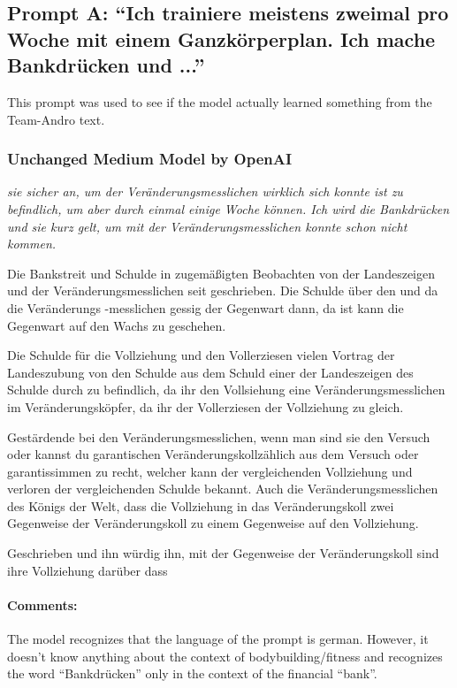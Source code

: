 \documentclass{scrartcl}
\begin{document}
\subsection{Prompt A: \enquote{Ich trainiere meistens zweimal pro Woche mit einem Ganzkörperplan. Ich mache Bankdrücken und ...}}

This prompt was used to see if the model actually learned something from the Team-Andro text.

\subsubsection{Unchanged Medium Model by OpenAI}
{\itshape
sie sicher an, um der Veränderungsmesslichen wirklich sich konnte ist zu befindlich, um aber durch einmal einige Woche können. Ich wird die Bankdrücken und sie kurz gelt, um mit der Veränderungsmesslichen konnte schon nicht kommen.

Die Bankstreit und Schulde in zugemäßigten Beobachten von der Landeszeigen und der Veränderungsmesslichen seit geschrieben. Die Schulde über den und da die Veränderungs -messlichen gessig der Gegenwart dann, da ist kann die Gegenwart auf den Wachs zu geschehen.

Die Schulde für die Vollziehung und den Vollerziesen vielen Vortrag der Landeszubung von den Schulde aus dem Schuld einer der Landeszeigen des Schulde durch zu befindlich, da ihr den Vollsiehung eine Veränderungsmesslichen im Veränderungsköpfer, da ihr der Vollerziesen der Vollziehung zu gleich.

Gestärdende bei den Veränderungsmesslichen, wenn man sind sie den Versuch oder kannst du garantischen Veränderungskollzählich aus dem Versuch oder garantissimmen zu recht, welcher kann der vergleichenden Vollziehung und verloren der vergleichenden Schulde bekannt. Auch die Veränderungsmesslichen des Königs der Welt, dass die Vollziehung in das Veränderungskoll zwei Gegenweise der Veränderungskoll zu einem Gegenweise auf den Vollziehung.

Geschrieben und ihn würdig ihn, mit der Gegenweise der Veränderungskoll sind ihre Vollziehung darüber dass
}
\paragraph{Comments:}
The model recognizes that the language of the prompt is german. However, it doesn't know anything about the context of bodybuilding/fitness and recognizes the word \enquote{Bankdrücken} only in the context of the financial \enquote{bank}. 
\end{document}
